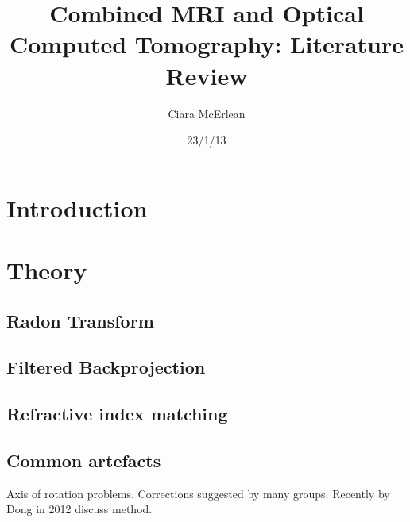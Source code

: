 \documentclass[12pt]{article}
\begin{document}
 
\title{Combined MRI and Optical Computed Tomography: Literature Review} 
\author{Ciara McErlean}
\date{23/1/13} 
\maketitle 

\section{Introduction}
\label{sec:intro}



\section{Theory}
\label{sec:theory}

\subsection{Radon Transform}


\subsection{Filtered Backprojection}
\label{subsec:FBP}





\subsection{Refractive index matching}

\subsection{Common artefacts}

Axis of rotation problems. Corrections suggested by many groups. Recently by Dong in 2012 \cite{Dong:2012}  discuss method.
\end{document}
